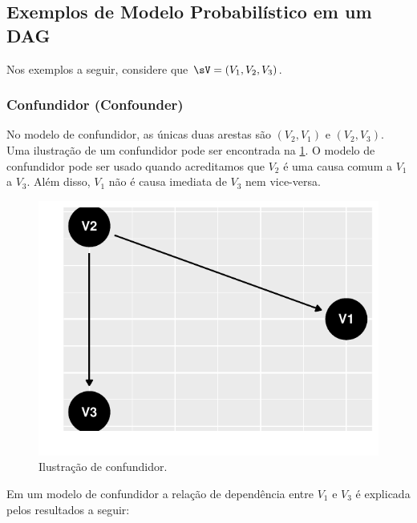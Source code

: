 \subsection{Exemplos de Modelo Probabilístico em um DAG}
\label{sec:dag-ex}

Nos exemplos a seguir, considere que
$\sV = (V_1, V_2, V_3)$.

\subsubsection{Confundidor (Confounder)}

No modelo de confundidor, 
as únicas duas arestas são 
$(V_2, V_1)$ e $(V_2, V_3)$.
Uma ilustração de um confundidor
pode ser encontrada 
na \cref{fig:confundidor}.
O modelo de confundidor pode ser usado quando
acreditamos que $V_2$ é uma causa comum a
$V_1$ a $V_3$. Além disso,
$V_1$ não é causa imediata de $V_3$ 
nem vice-versa.

\begin{knitrout}
\color{fgcolor}\begin{figure}[t]

{\centering \includegraphics[width=\maxwidth]{figure/confundidor-1} 

}

\caption[Ilustração de confundidor]{Ilustração de confundidor.}\label{fig:confundidor}
\end{figure}

\end{knitrout}

Em um modelo de confundidor 
a relação de dependência entre 
$V_1$ e $V_3$ é explicada pelos
resultados a seguir:

